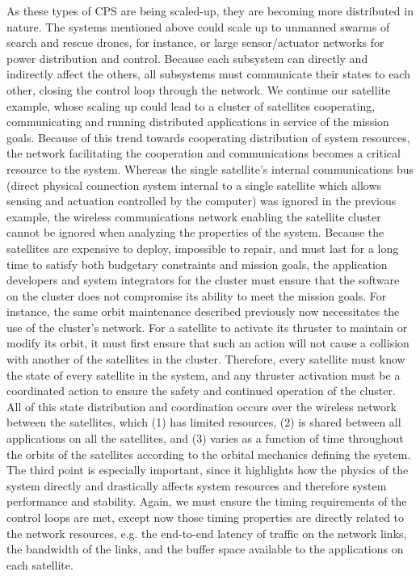 As these types of CPS are being scaled-up, they are becoming more
distributed in nature.  The systems mentioned above could scale up to
unmanned swarms of search and rescue drones, for instance, or large
sensor/actuator networks for power distribution and control. Because
each subsystem can directly and indirectly affect the others, all
subsystems must communicate their states to each other, closing the
control loop through the network.  We continue our satellite example,
whose scaling up could lead to a cluster of satellites cooperating,
communicating and running distributed applications in service of the
mission goals.  Because of this trend towards cooperating distribution
of system resources, the network facilitating the cooperation and
communications becomes a critical resource to the system.  Whereas the
single satellite's internal communications bus (direct physical
connection system internal to a single satellite which allows sensing
and actuation controlled by the computer) was ignored in the previous
example, the wireless communications network enabling the satellite
cluster cannot be ignored when analyzing the properties of the system.
Because the satellites are expensive to deploy, impossible to repair,
and must last for a long time to satisfy both budgetary constraints
and mission goals, the application developers and system integrators
for the cluster must ensure that the software on the cluster does not
compromise its ability to meet the mission goals.  For instance, the
same orbit maintenance described previously now necessitates the use
of the cluster's network.  For a satellite to activate its thruster to
maintain or modify its orbit, it must first ensure that such an action
will not cause a collision with another of the satellites in the
cluster.  Therefore, every satellite must know the state of every
satellite in the system, and any thruster activation must be a
coordinated action to ensure the safety and continued operation of the
cluster.  All of this state distribution and coordination occurs over
the wireless network between the satellites, which (1) has limited
resources, (2) is shared between all applications on all the
satellites, and (3) varies as a function of time throughout the orbits
of the satellites according to the orbital mechanics defining the
system.  The third point is especially important, since it highlights
how the physics of the system directly and drastically affects system
resources and therefore system performance and stability.  Again, we
must ensure the timing requirements of the control loops are met,
except now those timing properties are directly related to the network
resources, e.g. the end-to-end latency of traffic on the network
links, the bandwidth of the links, and the buffer space available to
the applications on each satellite.

